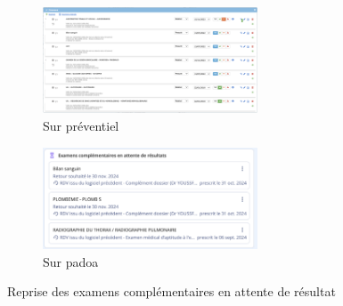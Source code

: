 \begin{figure}[h!]
    \centering
    \begin{subfigure}{\textwidth}
        \centering
        \includegraphics[width=0.7\textwidth]{4_attachments/figures/prev_ex_full.png} %
        \caption{Sur préventiel}
        \label{fig:image1}
    \end{subfigure}
    
    \vspace{1cm} %
    
    \begin{subfigure}{\textwidth}
        \centering
        \includegraphics[width=0.7\textwidth]{4_attachments/figures/padoa_ex_full.png} %
        \caption{Sur padoa}
        \label{fig:image2}
    \end{subfigure}
    
    \caption{Reprise des examens complémentaires en attente de résultat}
    \label{fig:stacked_images}
\end{figure}


\clearpage